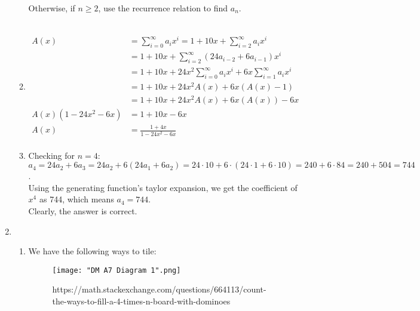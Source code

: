 \documentclass[a4paper]{article}
\begin{document}
\begin{enumerate}
\begin{enumerate}
            Otherwise, if $n \ge 2$, use the recurrence relation to find $a_n$. \\ \\

            \item \[
              \begin{split}
                A(x) &= \sum_{i=0}^{\infty} a_i x^i = 1 + 10x + \sum_{i=2}^{\infty} a_i x^i \\
                &= 1 + 10x + \sum_{i=2}^{\infty} (24a_{i-2} + 6a_{i-1})x^i \\
                &= 1 + 10x + 24x^2\sum_{i=0}^{\infty} a_{i}x^{i} + 6x\sum_{i=1}^{\infty} a_{i}x^{i} \\
                &= 1 + 10x + 24x^2A(x) + 6x(A(x) - 1) \\
                &= 1 + 10x + 24x^2A(x) + 6x(A(x)) - 6x \\
                A(x)(1 - 24x^2 - 6x) &= 1 + 10x - 6x \\
                A(x) &= \frac{1 + 4x}{1 - 24x^2 - 6x} \\
              \end{split}  
            \]

            \item Checking for $n = 4$:\\
            
            $a_4 = 24a_2 + 6a_3 = 24a_2 + 6(24a_1 + 6a_2) = 24 \cdot 10 + 6 \cdot (24 \cdot 1 + 6 \cdot 10) = 240 + 6 \cdot 84 = 240 + 504 = 744$. \\

            Using the generating function's taylor expansion, we get the coefficient of $x^4$ as 744, which means $a_4 = 744$. \\

            Clearly, the answer is correct.
        \end{enumerate}
        
        \newpage
        \item \begin{enumerate}
            \item We have the following ways to tile: \\
            \begin{figure}[ht]
                \centering
                \texttt{[image: "DM A7 Diagram 1".png]}
                \caption{https://math.stackexchange.com/questions/664113/count-the-ways-to-fill-a-4-times-n-board-with-dominoes}
            \end{figure}


\end{enumerate}
\end{enumerate}
\end{document}
